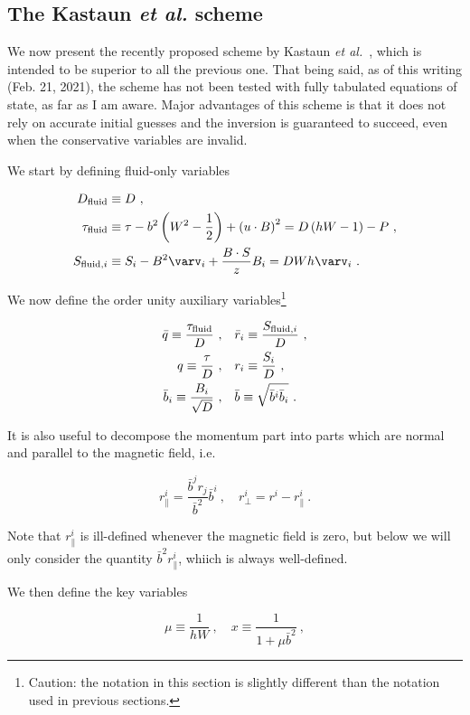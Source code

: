 \documentclass{article}
\newcommand{\etal}{\textit{et al.}\xspace}
\newcommand{\BdotS}{B\cdot S}
\newcommand{\udotB}{u\cdot B}
\newcommand{\eq}[1]{
\begin{equation}
    #1
\end{equation}
}
\newcommand{\al}[1] {
\begin{align}
    #1
\end{align}
}
\begin{document}
\subsection{The Kastaun \etal scheme}

We now present the recently proposed scheme by Kastaun \etal~\cite{kastaun2021robust}, which is intended to be superior to all the previous one. That being said, as of this writing (Feb. 21, 2021), the scheme has not been tested with fully tabulated equations of state, as far as I am aware. Major advantages of this scheme is that it does not rely on accurate initial guesses and the inversion is guaranteed to succeed, even when the conservative variables are invalid.

We start by defining fluid-only variables

\al{
  D_{\rm fluid} &\equiv D\ ,\\
  \tau_{\rm fluid} &\equiv \tau - b^{2}\left(W^{2} - \frac{1}{2}\right) + \left(\udotB\right)^{2} = D\left(hW - 1\right) - P\ ,\\
  S_{{\rm fluid},i} &\equiv S_{i} - B^{2}\varv_{i} + \frac{\BdotS}{z}B_{i} = DWh\varv_{i}\ .
}

\noindent We now define the order unity auxiliary variables\footnote{Caution: the notation in this section is slightly different than the notation used in previous sections.}

\al{
  \bar{q} \equiv \frac{\tau_{\rm fluid}}{D}\ ,&\quad \bar{r}_{i}\equiv\frac{S_{{\rm fluid},i}}{D}\ ,\\
  q \equiv \frac{\tau}{D}\ ,&\quad r_{i} \equiv \frac{S_{i}}{D}\ ,\\
  \bar{b}_{i} \equiv \frac{B_{i}}{\sqrt{D}}\ ,&\quad \bar{b} \equiv \sqrt{\bar{b}^{i}\bar{b}_{i}}\ .
}

\noindent It is also useful to decompose the momentum part into parts which are normal and parallel to the magnetic field, i.e.

\eq{
  r^{i}_{\parallel} = \frac{\bar{b}^{j}r_{j}}{\bar{b}^{2}}\bar{b}^{i}\ ,\quad r_{\perp}^{i} = r^{i} - r^{i}_{\parallel}\ .
}

\noindent Note that $r^{i}_{\parallel}$ is ill-defined whenever the magnetic field is zero, but below we will only consider the quantity $\bar{b}^{2}r^{i}_{\parallel}$, whiich is always well-defined.

We then define the key variables

\eq{
  \mu \equiv \frac{1}{hW}\ ,\quad x \equiv \frac{1}{1 + \mu \bar{b}^{2}}\ ,
}
\end{document}
